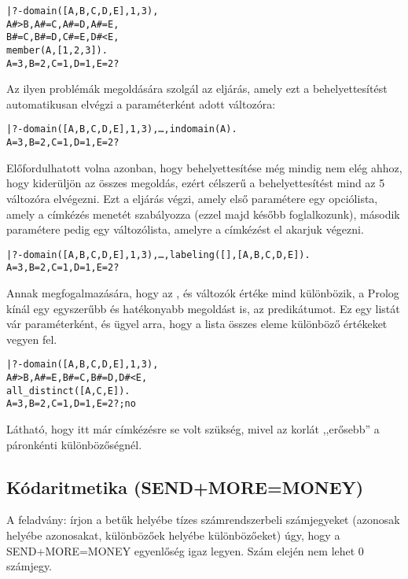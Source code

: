\begin{alltt}
| ?- domain([A,B,C,D,E], 1, 3),
     A #> B, A #\bs= C, A #\bs= D, A #\bs= E,
     B #\bs= C, B #\bs= D, C #\bs= E, D #< E,
     member(A, [1,2,3]).
A = 3, B = 2, C = 1, D = 1, E = 2 ?
\end{alltt}

Az ilyen problémák megoldására szolgál az  eljárás, amely
ezt a behelyettesítést automatikusan elvégzi a paraméterként adott változóra:

\begin{alltt}
| ?- domain([A,B,C,D,E], 1, 3), \ldots, indomain(A).
A = 3, B = 2, C = 1, D = 1, E = 2 ?
\end{alltt}

Előfordulhatott volna azonban, hogy  behelyettesítése még mindig
nem elég ahhoz, hogy kiderüljön az összes megoldás, ezért célszerű
a behelyettesítést mind az 5 változóra elvégezni. Ezt a 
eljárás végzi, amely első paramétere egy opciólista, amely a címkézés
menetét szabályozza (ezzel majd később foglalkozunk), második paramétere
pedig egy változólista, amelyre a címkézést el akarjuk végezni.

\begin{alltt}
| ?- domain([A,B,C,D,E], 1, 3), \ldots, labeling([],[A,B,C,D,E]).
A = 3, B = 2, C = 1, D = 1, E = 2 ?
\end{alltt}

Annak megfogalmazására, hogy az ,  és  változók értéke
mind különbözik, a Prolog kínál egy egyszerűbb és hatékonyabb megoldást is,
az  predikátumot. Ez egy listát vár paraméterként, és
ügyel arra, hogy a lista összes eleme különböző értékeket vegyen fel.

\begin{alltt}
| ?- domain([A,B,C,D,E], 1, 3),
     A #> B, A #\bs= E, B #\bs= C, B #\bs= D, D #< E,
     all_distinct([A,C,E]).
A = 3, B = 2, C = 1, D = 1, E = 2 ? ; no
\end{alltt}

Látható, hogy itt már címkézésre se volt szükség, mivel az 
korlát ,,erősebb'' a páronkénti különbözőségnél.

\subsection{Kódaritmetika (SEND+MORE=MONEY)}

\label{sendmoremoney}

A feladvány: írjon a betűk helyébe tízes számrendszerbeli számjegyeket
(azonosak helyébe azonosakat, különbözőek helyébe különbözőeket) úgy, hogy a
SEND+MORE=MONEY egyenlőség igaz legyen. Szám elején nem lehet 0 számjegy.

